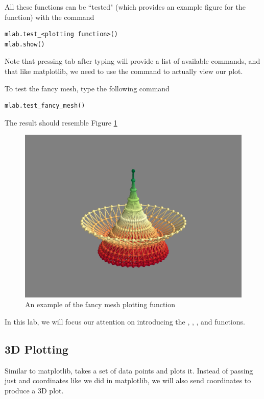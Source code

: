 All these functions can be ``tested" (which provides an example figure for the function) with the command
\begin{lstlisting}
mlab.test_<plotting function>()
mlab.show()
\end{lstlisting}
Note that pressing tab after typing  will provide a 
list of available commands, and that like matplotlib, we need to use the  command to actually view our plot. 

To test the fancy mesh, type the following command
\begin{lstlisting}
mlab.test_fancy_mesh()
\end{lstlisting}

The result should resemble Figure \ref{fig:fancymesh}

\begin{figure} 
\includegraphics[width=\textwidth]{fancymesh.png}
\caption{An example of the fancy mesh plotting function} 
\label{fig:fancymesh}
\end{figure}


In this lab, we will focus our attention on introducing the , , 
, and  functions. 


\subsection*{3D Plotting} Similar to matplotlib,  takes a set
of data points and plots it. Instead of passing just  and 
coordinates like we did in matplotlib, we will also send 
coordinates to produce a 3D plot. 

